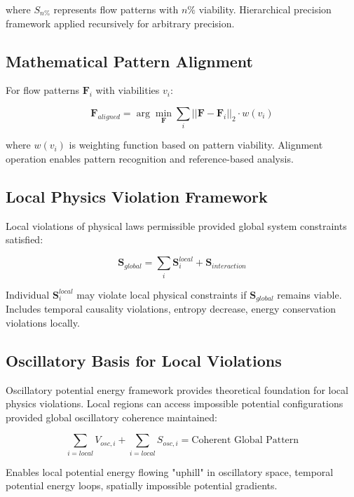\documentclass[12pt,a4paper]{article}
\begin{document}
where $S_{n\%}$ represents flow patterns with $n\%$ viability. Hierarchical precision framework applied recursively for arbitrary precision.

\subsection{Mathematical Pattern Alignment}

For flow patterns $\mathbf{F}_i$ with viabilities $v_i$:

\begin{equation}
\mathbf{F}_{aligned} = \arg\min_{\mathbf{F}} \sum_{i} ||\mathbf{F} - \mathbf{F}_i||_2 \cdot w(v_i)
\end{equation}

where $w(v_i)$ is weighting function based on pattern viability. Alignment operation enables pattern recognition and reference-based analysis.

\subsection{Local Physics Violation Framework}

Local violations of physical laws permissible provided global system constraints satisfied:

\begin{equation}
\mathbf{S}_{global} = \sum_{i} \mathbf{S}_i^{local} + \mathbf{S}_{interaction}
\end{equation}

Individual $\mathbf{S}_i^{local}$ may violate local physical constraints if $\mathbf{S}_{global}$ remains viable. Includes temporal causality violations, entropy decrease, energy conservation violations locally.

\subsection{Oscillatory Basis for Local Violations}

Oscillatory potential energy framework provides theoretical foundation for local physics violations. Local regions can access impossible potential configurations provided global oscillatory coherence maintained:

\begin{equation}
\sum_{i=local} V_{osc,i} + \sum_{i=local} S_{osc,i} = \text{Coherent Global Pattern}
\end{equation}

Enables local potential energy flowing "uphill" in oscillatory space, temporal potential energy loops, spatially impossible potential gradients.
\end{document}
